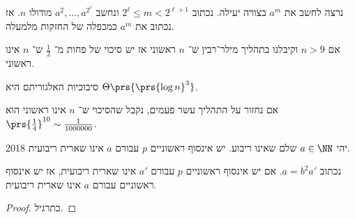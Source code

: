 \documentclass[a4paper,10pt,twoside,openany]{book}
\begin{document}
\begin{remark}
נרצה לחשב את
$a^m$
בצורה יעילה.
נכתוב
$2^{\ell} \leq m < 2^{\ell + 1}$
ונחשב
$a^2, \ldots, a^{2^{\ell}}$
מודולו
$n$.
אז נכתוב את
$a^m$
כמכפלה של החזקות מלמעלה.
\end{remark}

\begin{theorem}
אם
$n > 9$
וקיבלנו בתהליך מילר־רבין ש־%
$n$
ראשוני אז יש סיכוי של פחות מ־
$\frac{1}{2}$
ש־%
$n$
אינו ראשוני.
\end{theorem}
\begin{remark}
סיבוכיות האלגוריתם היא
$\Theta\prs{\prs{\log n}^3}$.
\end{remark}
\begin{remark}
אם נחזור על התהליך עשר פעמים, נקבל שהסיכוי ש־%
$n$
אינו ראשוני הוא
$\prs{\frac{1}{4}}^{10} \sim \frac{1}{1000000}$.
\end{remark}

\begin{theorem}
%
{2018}
יהי
$a \in \NN$
שלם שאינו ריבוע.
יש אינסוף ראשוניים
$p$
עבורם
$a$
אינו שארית ריבועית.
\end{theorem}

\begin{lemma}
נכתוב
$a = b^2 a'$.
אם יש אינסוף ראשוניים
$p$
עבורם
$a'$
אינו שארית ריבועית, אז יש אינסוף ראשוניים עבורם
$a$
אינו שארית ריבועית.
\end{lemma}

\begin{proof}
כתרגיל.
\end{proof}
\end{document}
